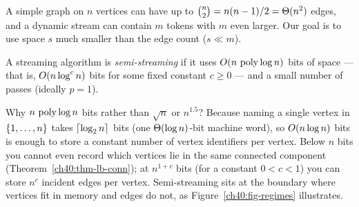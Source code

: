 A simple graph on $n$ vertices can have up to $\binom{n}{2}=n(n-1)/2=\Theta(n^2)$
edges, and a dynamic stream can contain $m$ tokens with $m$ even larger. Our
goal is to use space $s$ much smaller than the edge count ($s \ll m$).

\begin{definition}\label{ch40:def-semistream}
A streaming algorithm is \emph{semi-streaming} if it uses
$O(n\,\operatorname{poly}\log n)$ bits of space --- that is, $O(n\log^c n)$ bits for some
fixed constant $c \ge 0$ --- and a small number of passes (ideally $p=1$).
\end{definition}

\begin{intuitionbox}
Why $n\,\operatorname{poly}\log n$ bits rather than $\sqrt{n}$ or $n^{1.5}$? Because naming a
single vertex in $\{1,\dots,n\}$ takes $\lceil\log_2 n\rceil$ bits (one
$\Theta(\log n)$-bit machine word), so $O(n\log n)$ bits is enough to store a
constant number of vertex identifiers per vertex. Below $n$ bits you cannot even
record which vertices lie in the same connected component
(Theorem~\ref{ch40:thm-lb-conn}); at $n^{1+c}$ bits (for a constant $0<c<1$) you
can store $n^c$ incident edges per vertex. Semi-streaming sits at the boundary
where vertices fit in memory and edges do not, as Figure~\ref{ch40:fig-regimes}
illustrates.
\end{intuitionbox}

